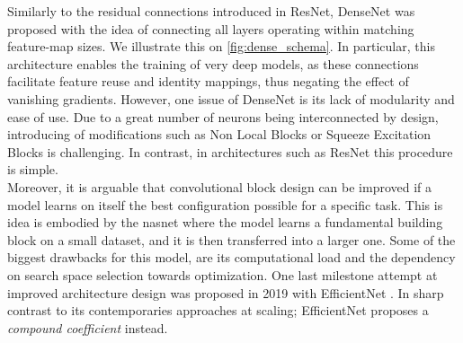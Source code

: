 \noindent Similarly to the residual connections introduced in ResNet, DenseNet 
\autocite{huang2017densely} was proposed with the idea of connecting all layers operating within 
matching feature-map sizes. We illustrate this on \autoref{fig:dense_schema}. In particular, this 
architecture enables the training of very deep models, as these connections facilitate feature reuse 
and identity mappings, thus negating the effect of vanishing gradients. However, one issue of 
DenseNet is its lack of  modularity and ease of use. Due to a great number of 
neurons being interconnected by design, introducing of modifications such as Non Local Blocks  
\autocite{wang2018non} or Squeeze Excitation Blocks  \autocite{hu2018squeeze} is challenging. In 
contrast, in architectures such as ResNet this procedure is simple.\\


\noindent Moreover, it is arguable that convolutional block design can be improved if a model 
learns on itself the best configuration possible for a specific task. This is idea is embodied by 
the \gls{nasnet} \autocite{zoph2018learning} where the model learns a fundamental building block on a 
small dataset, and it is then transferred into a larger one. Some of the biggest drawbacks for this 
model, are its computational load and the dependency on search space selection towards 
optimization. One last milestone attempt at improved architecture design was proposed in 2019 with 
EfficientNet \autocite{tan2019efficientnet}. In sharp contrast to its contemporaries approaches at 
scaling; EfficientNet proposes a \emph{compound coefficient} instead.\\

